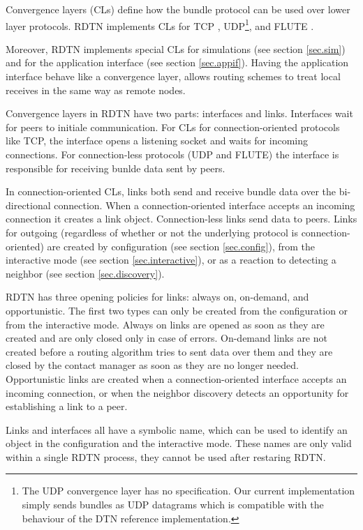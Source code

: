 \documentclass{article}
\begin{document}
Convergence layers (CLs) define how the bundle protocol can be used over lower
layer protocols. RDTN implements CLs for TCP \cite{dtn-tcp-cl}, UDP\footnote{The UDP
convergence layer has no specification. Our current implementation simply sends
bundles as UDP datagrams which is compatible with the behaviour of the DTN
reference implementation.}, and FLUTE \cite{uni-dtn}.

Moreover, RDTN implements special CLs for simulations (see section
\ref{sec.sim}) and for the application interface (see section \ref{sec.appif}).
Having the application interface behave like a convergence layer, allows routing
schemes to treat local receives in the same way as remote nodes.

Convergence layers in RDTN have two parts: interfaces and links. Interfaces wait
for peers to initiale communication. For CLs for connection-oriented protocols
like TCP, the interface opens a listening socket and waits for incoming
connections. For connection-less protocols (UDP and FLUTE) the interface is
responsible for receiving bunlde data sent by peers.

In connection-oriented CLs, links both send and receive bundle data over the
bi-directional connection. When a connection-oriented interface accepts an
incoming connection it creates a link object. Connection-less links send data to
peers. Links for outgoing (regardless of whether or not the underlying protocol
is connection-oriented) are created by configuration (see section
\ref{sec.config}), from the interactive mode (see section
\ref{sec.interactive}), or as a reaction to detecting a neighbor (see section
\ref{sec.discovery}).

RDTN has three opening policies for links: always on, on-demand, and
opportunistic. The first two types can only be created from the
configuration or from the interactive mode. Always on links are opened as soon
as they are created and are only closed only in case of errors. On-demand links
are not created before a routing algorithm tries to sent data over them and they
are closed by the contact manager as soon as they are no longer needed.
Opportunistic links are created when a connection-oriented interface accepts an
incoming connection, or when the neighbor discovery detects an opportunity for
establishing a link to a peer.

Links and interfaces all have a symbolic name, which can be used to identify an
object in the configuration and the interactive mode. These names are only valid
within a single RDTN process, they cannot be used after restaring RDTN.
\end{document}
